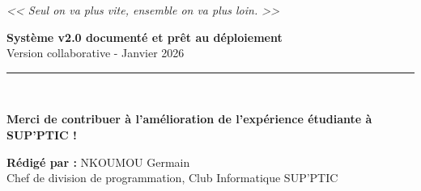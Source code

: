 \documentclass[11pt,a4paper]{article}
\begin{document}
\vspace{0.5cm}

\begin{center}
    \textit{<< Seul on va plus vite, ensemble on va plus loin. >>}
\end{center}

\vfill

\begin{center}
     \textbf{Système v2.0 documenté et prêt au déploiement} \\
    \small Version collaborative - Janvier 2026 \\[0.5cm]
    
    \rule{0.5\textwidth}{0.4pt} \\[0.3cm]
\end{center}

\begin{center}
     \textbf{Merci de contribuer à l'amélioration de l'expérience étudiante à SUP'PTIC !} 
\end{center}

\vspace{1cm}
\begin{center}
    \textbf{Rédigé par :} NKOUMOU Germain \\
    Chef de division de programmation, Club Informatique SUP’PTIC
\end{center}
\end{document}

